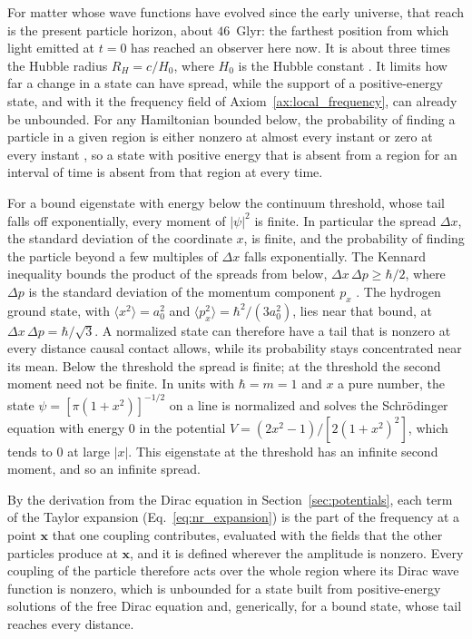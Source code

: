 \documentclass[aps,prd,onecolumn,tightenlines,nofootinbib,notitlepage,11pt,floatfix]{revtex4-2}
\theoremstyle{indentedtheorem}
\begin{document}
For matter whose wave functions have evolved since the early universe, that reach is the present particle horizon, about $46$~Glyr: the farthest position from which light emitted at $t=0$ has reached an observer here now. It is about three times the Hubble radius $R_H=c/H_0$, where $H_0$ is the Hubble constant \citep{DavisLineweaver2004Expanding}. It limits how far a change in a state can have spread, while the support of a positive-energy state, and with it the frequency field of Axiom~\ref{ax:local_frequency}, can already be unbounded. For any Hamiltonian bounded below, the probability of finding a particle in a given region is either nonzero at almost every instant or zero at every instant \citep[Theorem~2]{Hegerfeldt1998Instantaneous}, so a state with positive energy that is absent from a region for an interval of time is absent from that region at every time.

For a bound eigenstate with energy below the continuum threshold, whose tail falls off exponentially, every moment of $|\psi|^2$ is finite. In particular the spread $\Delta x$, the standard deviation of the coordinate $x$, is finite, and the probability of finding the particle beyond a few multiples of $\Delta x$ falls exponentially. The Kennard inequality bounds the product of the spreads from below, $\Delta x\,\Delta p\geq\hbar/2$, where $\Delta p$ is the standard deviation of the momentum component $p_x$ \citep{Sakurai2020Modern}. The hydrogen ground state, with $\langle x^2\rangle=a_0^2$ and $\langle p_x^2\rangle=\hbar^2/(3a_0^2)$, lies near that bound, at $\Delta x\,\Delta p=\hbar/\sqrt{3}$. A normalized state can therefore have a tail that is nonzero at every distance causal contact allows, while its probability stays concentrated near its mean. Below the threshold the spread is finite; at the threshold the second moment need not be finite. In units with $\hbar=m=1$ and $x$ a pure number, the state $\psi=[\pi(1+x^2)]^{-1/2}$ on a line is normalized and solves the Schr\"odinger equation with energy $0$ in the potential $V=(2x^2-1)/[2(1+x^2)^2]$, which tends to $0$ at large $|x|$. This eigenstate at the threshold has an infinite second moment, and so an infinite spread.

By the derivation from the Dirac equation in Section~\ref{sec:potentials}, each term of the Taylor expansion (Eq.~\eqref{eq:nr_expansion}) is the part of the frequency at a point $\mathbf{x}$ that one coupling contributes, evaluated with the fields that the other particles produce at $\mathbf{x}$, and it is defined wherever the amplitude is nonzero. Every coupling of the particle therefore acts over the whole region where its Dirac wave function is nonzero, which is unbounded for a state built from positive-energy solutions of the free Dirac equation \citep{Hegerfeldt1998Instantaneous} and, generically, for a bound state, whose tail reaches every distance.
\end{document}
